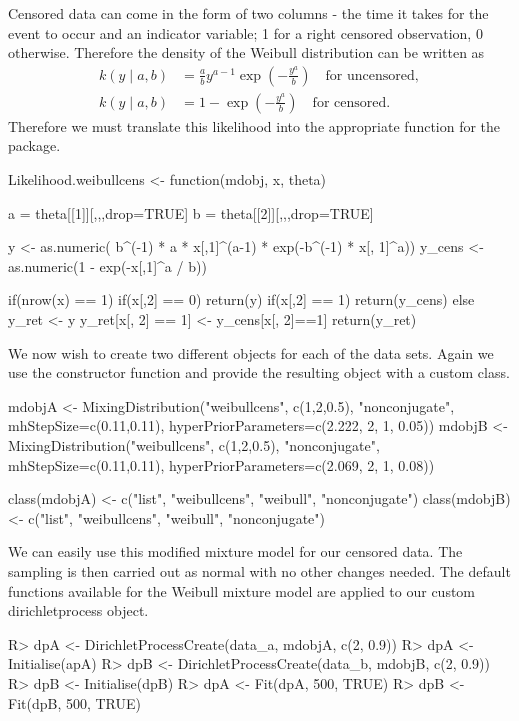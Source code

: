 \documentclass[nojss]{jss}
\begin{document}
Censored data can come in the form of two columns - the time it takes for the event to occur and an indicator variable; 1 for a right censored observation, 0 otherwise. Therefore the density of the Weibull distribution can be written as
\begin{align*}
k(y \mid a , b) & = \frac{a}{b} y ^{a-1}  \exp \left( -  \frac{y^a}{b}  \right) \quad \text{for uncensored}, \\
k(y \mid a , b) & = 1 - \exp \left( -\frac{y^a}{b} \right) \quad \text{for censored}.
\end{align*}
Therefore we must translate this likelihood into the appropriate function for the  package.

\begin{CodeInput}
Likelihood.weibullcens <- function(mdobj, x, theta){
  a = theta[[1]][,,,drop=TRUE]
  b = theta[[2]][,,,drop=TRUE]

  y <- as.numeric(
  b^(-1) * a * x[,1]^(a-1) * exp(-b^(-1) * x[, 1]^a))
  y_cens <- as.numeric(1 - exp(-x[,1]^a / b))

  if(nrow(x) == 1){
    if(x[,2] == 0) return(y)
    if(x[,2] == 1) return(y_cens)
  }
  else{
    y_ret <- y
    y_ret[x[, 2] == 1] <- y_cens[x[, 2]==1]
    return(y_ret)
  }
}
\end{CodeInput}

We now wish to create two different  objects for each of the data sets. Again we use the  constructor function and provide the resulting object with a custom class.

\begin{CodeInput}
mdobjA <- MixingDistribution("weibullcens", c(1,2,0.5), "nonconjugate",
mhStepSize=c(0.11,0.11), hyperPriorParameters=c(2.222, 2, 1, 0.05))
mdobjB <- MixingDistribution("weibullcens", c(1,2,0.5), "nonconjugate",
mhStepSize=c(0.11,0.11), hyperPriorParameters=c(2.069, 2, 1, 0.08))

class(mdobjA) <- c("list", "weibullcens", "weibull", "nonconjugate")
class(mdobjB) <- c("list", "weibullcens", "weibull", "nonconjugate")
\end{CodeInput}

We can easily use this modified mixture model for our censored data. The sampling is then carried out as normal with no other changes needed. The default functions available for the Weibull mixture model are applied to our custom dirichletprocess object.
\begin{Schunk}
\begin{Sinput}
R> dpA <- DirichletProcessCreate(data_a, mdobjA, c(2, 0.9))
R> dpA <- Initialise(apA)
R> dpB <- DirichletProcessCreate(data_b, mdobjB, c(2, 0.9))
R> dpB <- Initialise(dpB)
R> dpA <- Fit(dpA, 500, TRUE)
R> dpB <- Fit(dpB, 500, TRUE)
\end{Sinput}
\end{Schunk}
\end{document}
